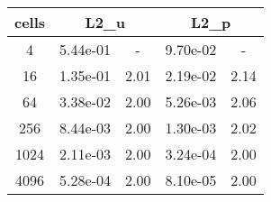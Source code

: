 \documentclass[10pt]{report}
\begin{document}
\begin{table}[H]
\begin{center}
\begin{tabular}{|c|c|c|c|c|} \hline
cells & 
\multicolumn{2}{|c|}{L2_u} & 
\multicolumn{2}{|c|}{L2_p}\\ \hline
4 & 5.44e-01 & - & 9.70e-02 & -\\ \hline
16 & 1.35e-01 & 2.01 & 2.19e-02 & 2.14\\ \hline
64 & 3.38e-02 & 2.00 & 5.26e-03 & 2.06\\ \hline
256 & 8.44e-03 & 2.00 & 1.30e-03 & 2.02\\ \hline
1024 & 2.11e-03 & 2.00 & 3.24e-04 & 2.00\\ \hline
4096 & 5.28e-04 & 2.00 & 8.10e-05 & 2.00\\ \hline
\end{tabular}
\end{center}
\end{table}
\end{document}
